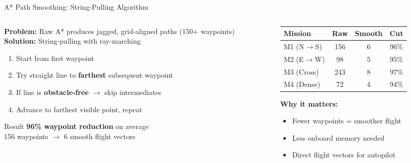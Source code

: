 \documentclass[aspectratio=169, 11pt]{beamer}
\begin{document}
\begin{frame}{A* Path Smoothing: String-Pulling Algorithm}
\begin{columns}[T]
\begin{column}{0.55\textwidth}
\textcolor{neongreen}{\textbf{Problem:}} Raw A* produces jagged, grid-aligned paths (150+ waypoints)\\[0.3cm]

\textcolor{accentblue}{\textbf{Solution:}} String-pulling with ray-marching\\[0.2cm]
\small
\begin{enumerate}
    \item Start from first waypoint
    \item Try straight line to \textbf{farthest} subsequent waypoint
    \item If line is \textbf{obstacle-free} $\rightarrow$ skip intermediates
    \item Advance to farthest visible point, repeat
\end{enumerate}

\vspace{0.3cm}
\begin{exampleblock}{Result}
\footnotesize
\textbf{96\% waypoint reduction} on average\\
156 waypoints $\rightarrow$ 6 smooth flight vectors
\end{exampleblock}
\end{column}
\begin{column}{0.43\textwidth}
\small
\begin{tabular}{@{}lccc@{}}
\toprule
\textcolor{neongreen}{\textbf{Mission}} & \textbf{Raw} & \textbf{Smooth} & \textbf{Cut} \\
\midrule
M1 (N$\to$S) & 156 & 6 & 96\% \\
M2 (E$\to$W) & 98 & 5 & 95\% \\
M3 (Cross) & 243 & 8 & 97\% \\
M4 (Dense) & 72 & 4 & 94\% \\
\bottomrule
\end{tabular}
\vspace{0.3cm}

\textcolor{warnorange}{\textbf{Why it matters:}}
\begin{itemize}\footnotesize
    \item Fewer waypoints = smoother flight
    \item Less onboard memory needed
    \item Direct flight vectors for autopilot
\end{itemize}
\end{column}
\end{columns}
\end{frame}
\end{document}
